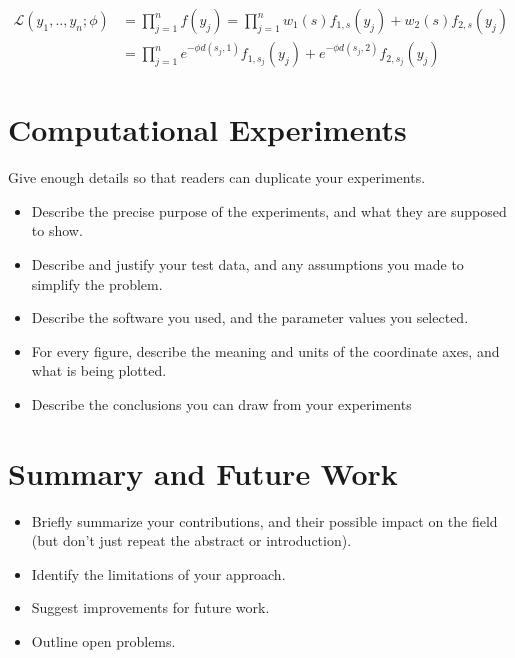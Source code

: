 \documentclass[10pt]{article}
\begin{document}
\begin{align*}    
\mathcal{L} (y_1,..,y_n; \phi) &= \prod_{j=1}^{n} f(y_j) = \prod_{j=1}^{n}  w_{1}(s)f_{1,s}(y_j) + w_{2}(s)f_{2,s}(y_j)              \\
&         = \prod_{j=1}^{n} e^{-\phi d(s_j,1)}f_{1,s_j}(y_j) +  e^{-\phi d(s_j,2)}f_{2,s_j}(y_j)
\end{align*}


\section{Computational Experiments}
Give enough details so that readers can duplicate your experiments.

\begin{itemize}
	\item Describe the precise purpose of the experiments, and what they 
	are supposed to show.
	
	\item Describe and justify your test data, and any assumptions you made to 
	simplify the problem.
	
	\item Describe the software you used, and the 
	parameter values you selected.
	
	\item 
	For every figure, describe the meaning and units of the coordinate axes, 
	and what is being plotted.
	
	\item Describe the conclusions you can draw from your experiments
\end{itemize}


\section{Summary and Future Work}
\begin{itemize}
	\item Briefly summarize your contributions, and their possible
	impact on the field (but don't just repeat the abstract or introduction).
	\item Identify the limitations of your approach.
	\item Suggest improvements for future work.
	\item Outline open problems.
\end{itemize}



 
%



\end{document}
